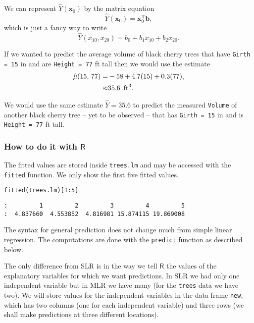 We can represent \(\hat{Y}(\mathbf{x}_{0})\) by the matrix equation
\begin{equation}
\label{eq-mlr-single-yhat-matrix}
\hat{Y}(\mathbf{x}_{0})=\mathbf{x}_{0}^{\mathrm{T}}\mathbf{b},
\end{equation}
which is just a fancy way to write
\begin{equation}
\hat{Y}(x_{10},x_{20})=b_{0}+b_{1}x_{10}+b_{2}x_{20}.
\end{equation}


If we wanted to predict the average volume of black cherry trees that
have \texttt{Girth = 15} in and are \texttt{Height = 77} ft tall then we would use
the estimate
\begin{alignat*}{1}
\hat{\mu}(15,\,77)= & -58+4.7(15)+0.3(77),\\
\approx & 35.6\mbox{\,\ ft}^{3}.
\end{alignat*}

We would use the same estimate \(\hat{Y}=35.6\) to predict the
measured \texttt{Volume} of another black cherry tree -- yet to be observed
-- that has \texttt{Girth = 15} in and is \texttt{Height = 77} ft tall.

\subsubsection{How to do it with \(\mathsf{R}\)}
\label{sec-12-2-2-1}

The fitted values are stored inside \texttt{trees.lm} and may be accessed
with the \texttt{fitted} function. We only show the first five fitted values.

\begin{verbatim}
fitted(trees.lm)[1:5]
\end{verbatim}

\begin{verbatim}
:         1         2         3         4         5 
:  4.837660  4.553852  4.816981 15.874115 19.869008
\end{verbatim}

The syntax for general prediction does not change much from simple
linear regression. The computations are done with the \texttt{predict}
function as described below.

The only difference from SLR is in the way we tell \(\mathsf{R}\) the
values of the explanatory variables for which we want predictions. In
SLR we had only one independent variable but in MLR we have many (for
the \texttt{trees} data we have two). We will store values for the
independent variables in the data frame \texttt{new}, which has two columns
(one for each independent variable) and three rows (we shall make
predictions at three different locations).

